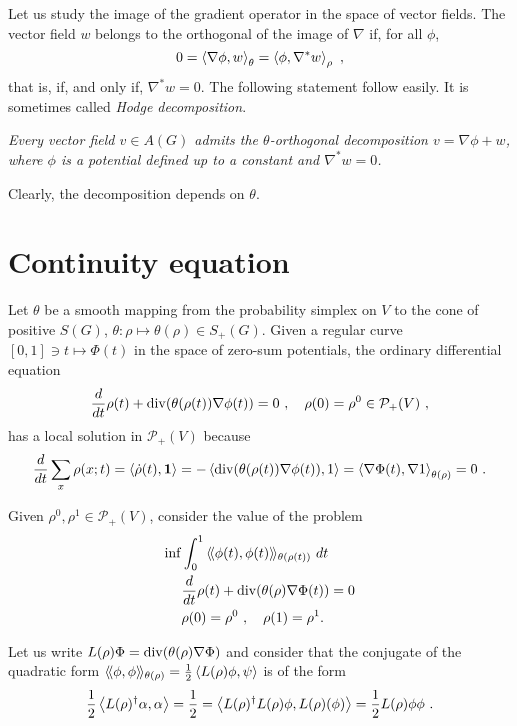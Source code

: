 \documentclass[12pt,a4paper]{amsart}
\theoremstyle{definition}
\begin{document}
Let us study the image of the gradient operator in the space of vector
fields. The vector field $w$ belongs to the  orthogonal of the image of
$\nabla$ if, for all $\phi$,
\begin{equation*}
  0 = \scalarat \theta {\nabla \phi} w = \scalarat \rho \phi {\nabla^* w} \ ,
\end{equation*}
that is, if, and only if, $\nabla^* w  = 0$. The following
statement follow easily. It is sometimes called \emph{Hodge decomposition}.

\emph{Every vector field $v \in A(G)$ admits the $\theta$-orthogonal
  decomposition $v = \nabla \phi + w$, where $\phi$ is a potential
  defined up to a constant and $\nabla^* w = 0$.}

Clearly, the decomposition depends on $\theta$.

\section{Continuity equation}
\label{sec:continuity}

Let $\theta$ be a smooth mapping from the probability simplex on $V$ to the
cone of positive $S(G)$, $\theta \colon \rho \mapsto \theta(\rho) \in
S_+(G)$. Given a regular curve $[0,1] \ni t \mapsto \Phi(t)$ in the
space of zero-sum potentials, the ordinary differential equation
\begin{equation*}
  \derivby t \rho(t) +  \Div(\theta(\rho(t))\nabla \phi(t)) = 0 \ , \quad
  \rho(0) = \rho^0 \in \mathcal P_+(V) \ ,
\end{equation*}
has a local solution in $\mathcal P_+(V)$ because
\begin{equation*}
  \derivby t \sum_x \rho(x;t) = \scalarof {\dot \rho(t)}{\one} = 
 - \scalarof {\Div(\theta(\rho(t))\nabla \phi(t))}{1} = \scalarat
 {\theta(\rho)} {\nabla \Phi(t)}{\nabla 1}
 = 0 \ .
\end{equation*}

Given $\rho^0, \rho^1 \in \mathcal P_+(V)$, consider the value of the problem
\begin{align*}
 \inf &\int_0^1 \Scalarat {\theta(\rho(t))} {\phi(t)}{\phi(t)} \ dt
 \\
 &\derivby t \rho(t) +  \Div(\theta(\rho)\nabla \Phi(t)) = 0 \\
 &\rho(0) = \rho^0 \ , \quad \rho(1) = \rho^1.
\end{align*}

Let us write $L(\rho)\Phi = \Div(\theta(\rho)\nabla \Phi)$ and
consider that the conjugate of the quadratic form
$\Scalarat {\theta(\rho)} \phi \phi = \frac 12 \scalarof {L(\rho)\phi}
\psi$ is of the form
\begin{equation*}
  \frac 12 \scalarof {L(\rho)^\dagger \alpha} {\alpha} = \frac12 =
  \scalarof {L(\rho)^\dagger L(\rho) \phi} {L(\rho)(\phi)} = \frac12
  {L(\rho) \phi} \phi \ . 
\end{equation*}
\end{document}
